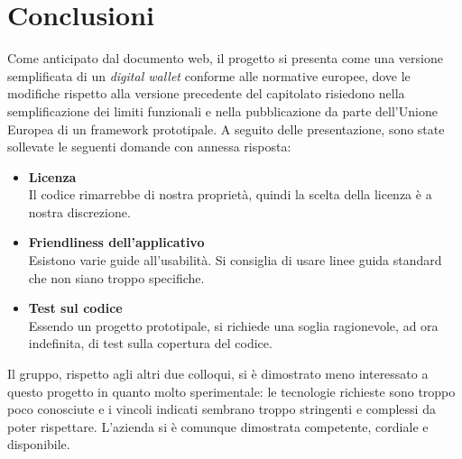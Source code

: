 \documentclass[a4paper, 12pt]{article}
\begin{document}
\section*{Conclusioni}
Come anticipato dal documento web, il progetto si presenta come una versione semplificata di un \textit{digital wallet} conforme alle normative europee, dove le modifiche rispetto alla versione precedente del capitolato risiedono nella semplificazione dei limiti funzionali e nella pubblicazione da parte dell'Unione Europea di un framework prototipale.
A seguito delle presentazione, sono state sollevate le seguenti domande con annessa risposta:
\begin{itemize}
    \item \textbf{Licenza} \\ Il codice rimarrebbe di nostra proprietà, quindi la scelta della licenza è a nostra discrezione.
    \item \textbf{Friendliness dell'applicativo} \\ Esistono varie guide all'usabilità. Si consiglia di usare linee guida standard che non siano troppo specifiche.
    \item \textbf{Test sul codice} \\ Essendo un progetto prototipale, si richiede una soglia ragionevole, ad ora indefinita, di test sulla copertura del codice.
\end{itemize}
Il gruppo, rispetto agli altri due colloqui, si è dimostrato meno interessato a questo progetto in quanto molto sperimentale: le tecnologie richieste sono troppo poco conosciute e i vincoli indicati sembrano troppo stringenti e complessi da poter rispettare. L'azienda si è comunque dimostrata competente, cordiale e disponibile.
\end{document}
